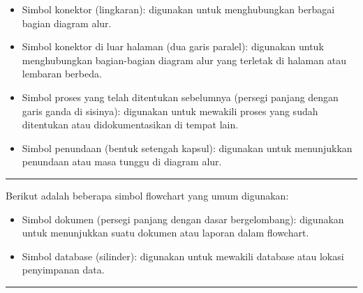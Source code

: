 \documentclass[12pt,preprintnumbers,amsmath,amssymb,nofootinbib,superscriptaddress]{revtex4-1}
\begin{document}
\begin{itemize}
    \item Simbol konektor (lingkaran): digunakan untuk menghubungkan berbagai bagian diagram alur.
    \item Simbol konektor di luar halaman (dua garis paralel): digunakan untuk menghubungkan bagian-bagian diagram alur yang terletak di halaman atau lembaran berbeda.
    \item Simbol proses yang telah ditentukan sebelumnya (persegi panjang dengan garis ganda di sisinya): digunakan untuk mewakili proses yang sudah ditentukan atau didokumentasikan di tempat lain.
    \item Simbol penundaan (bentuk setengah kapsul): digunakan untuk menunjukkan penundaan atau masa tunggu di diagram alur.
\end{itemize}


\vspace{1cm}

\newpage

\label{Ueff}
\vspace{-0.7cm}
\vspace{-0.2cm}\hrule

\vspace{2cm}

Berikut adalah beberapa simbol flowchart yang umum digunakan:

\begin{itemize}
    \item Simbol dokumen (persegi panjang dengan dasar bergelombang): digunakan untuk menunjukkan suatu dokumen atau laporan dalam flowchart.
    \item Simbol database (silinder): digunakan untuk mewakili database atau lokasi penyimpanan data.
\end{itemize}


\vspace{1cm}

\newpage

\label{Ueff}
\vspace{-0.7cm}
\vspace{-0.2cm}\hrule

\vspace{1cm}
\end{document}
